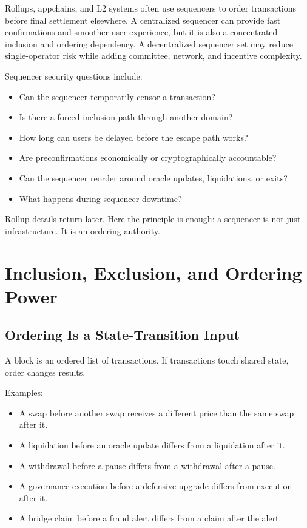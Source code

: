Rollups, appchains, and L2 systems often use sequencers to order transactions before final settlement elsewhere. A centralized sequencer can provide fast confirmations and smoother user experience, but it is also a concentrated inclusion and ordering dependency. A decentralized sequencer set may reduce single-operator risk while adding committee, network, and incentive complexity.

Sequencer security questions include:

\begin{itemize}
\item Can the sequencer temporarily censor a transaction?
\item Is there a forced-inclusion path through another domain?
\item How long can users be delayed before the escape path works?
\item Are preconfirmations economically or cryptographically accountable?
\item Can the sequencer reorder around oracle updates, liquidations, or exits?
\item What happens during sequencer downtime?
\end{itemize}

Rollup details return later. Here the principle is enough: a sequencer is not just infrastructure. It is an ordering authority.

\section{Inclusion, Exclusion, and Ordering Power}

\subsection{Ordering Is a State-Transition Input}

A block is an ordered list of transactions. If transactions touch shared state, order changes results.

Examples:

\begin{itemize}
\item A swap before another swap receives a different price than the same swap after it.
\item A liquidation before an oracle update differs from a liquidation after it.
\item A withdrawal before a pause differs from a withdrawal after a pause.
\item A governance execution before a defensive upgrade differs from execution after it.
\item A bridge claim before a fraud alert differs from a claim after the alert.
\end{itemize}

